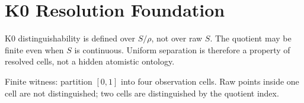 \section{K0 Resolution Foundation}

K0 distinguishability is defined over \(S/\rho\), not over raw \(S\). The quotient may be finite even
when \(S\) is continuous. Uniform separation is therefore a property of resolved cells, not a hidden
atomistic ontology.

Finite witness: partition \([0,1]\) into four observation cells. Raw points inside one cell are not
distinguished; two cells are distinguished by the quotient index.
